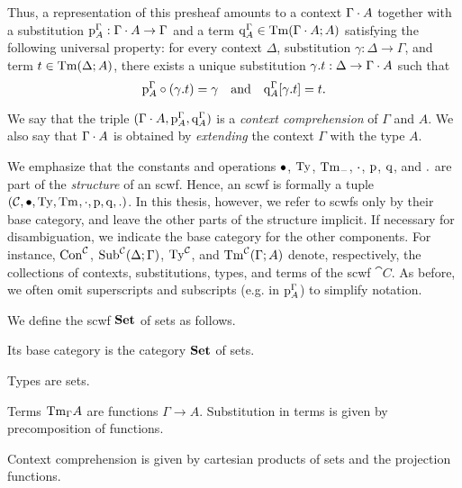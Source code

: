\begin{enum}
    Thus, a representation of this presheaf amounts to a context $\Sextcon{\Gamma}{A}$ together with a substitution $\Spsub[\Gamma][A] : \Sextcon{\Gamma}{A} \to \Gamma$ and a term $\Sq[\Gamma][A] \in \STm[\Sextcon{\Gamma}{A}]{A}$ satisfying the following universal property:
    for every context $\Delta$, substitution $\gamma : \Delta \to \Gamma$, and term $t \in \STm[\Delta]{A}$, there exists a unique substitution $\Sextsub{\gamma}{t} : \Delta \to \Sextcon{\Gamma}{A}$ such that
    \[ \Scompsub{\Spsub[\Gamma][A]}{(\Sextsub{\gamma}{t})} = \gamma
        \quad\text{and}\quad
        \Ssubst{\Sq[\Gamma][A]}{\Sextsub{\gamma}{t}} = t. \]

    We say that the triple $(\Sextcon{\Gamma}{A}, \Spsub[\Gamma][A], \Sq[\Gamma][A])$ is a \emph{context comprehension} of $\Gamma$ and $A$. We also say that $\Sextcon{\Gamma}{A}$ is obtained by \emph{extending} the context $\Gamma$ with the type $A$.
\end{enum}

We emphasize that the constants and operations $\Sempcon$, $\STy$, $\STm{-}$, $\Sextcon{}{}$, $\Spsub$, $\Sq$, and $\Sextsub{}{}$ are part of the \textit{structure} of an scwf. Hence, an scwf is formally a tuple $(\cat{C}, \Sempcon, \STy, \STm{}, \Sextcon{}{}, \Spsub, \Sq, \Sextsub{}{})$. In this thesis, however, we refer to scwfs only by their base category, and leave the other parts of the structure implicit. If necessary for disambiguation, we indicate the base category for the other components. For instance, $\SCon[\cat{C}]$, $\SSub{\Delta}{\Gamma}[\cat{C}]$, $\STy[\cat{C}]$, and $\STm[\Gamma]{A}[\cat{C}]$ denote, respectively, the collections of contexts, substitutions, types, and terms of the scwf $\cat{C}$. As before, we often omit superscripts and subscripts (e.g. in $\Spsub[\Gamma][A]$) to simplify notation.

\begin{ex} \label{ex:set-scwf}
We define the scwf $\mathbf{Set}$ of sets as follows.
\begin{items}
    \item Its base category is the category $\mathbf{Set}$ of sets.
    \item Types are sets.
    \item Terms $\STm{\Gamma}{A}$ are functions $\Gamma \to A$. Substitution in terms is given by precomposition of functions.
    \item Context comprehension is given by cartesian products of sets and the projection functions.
\end{items}
\end{ex}

